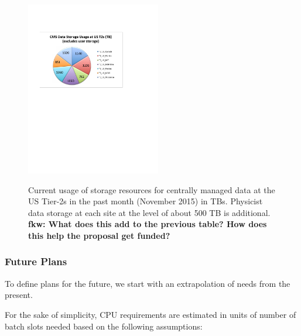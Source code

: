 \documentclass[11pt,a4paper]{article}
\begin{document}
\begin{figure}
\begin{center}
\includegraphics[height=3in]{storageUtilizationAtUST2s-Chart.pdf}
\label{storageUtilizationAtUST2s-Chart}
\end{center}
\caption{Current usage of storage resources for centrally managed
data at the US Tier-2s in the past month (November 2015) in TBs. 
Physicist data storage at each site at the level of about 500 TB
is additional. {\bf fkw: What does this add to the previous table? How does this help the proposal get funded?}}
\end{figure}

\subsubsection{Future Plans}


To define plans for the future, we start with an extrapolation of needs from the present.


For the sake of simplicity, CPU requirements are estimated in units of number of batch slots
needed based on the following assumptions:

\end{document}
